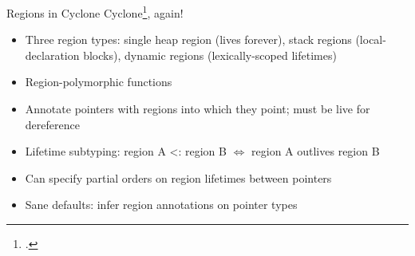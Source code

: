 \documentclass[aspectratio=169]{beamer}
\begin{document}
\begin{frame}{Regions in Cyclone}
    Cyclone\footcite{grossman_region-based_2002}, again!
    \begin{itemize}[<+->]
        \item Three region types: single \alert{heap} region (lives forever), \alert{stack} regions (local-declaration blocks), \alert{dynamic} regions (lexically-scoped lifetimes)
        \item Region-polymorphic functions
        \item Annotate pointers with regions into which they point; must be live for dereference
        \item Lifetime subtyping: region A <: region B $\Leftrightarrow$ region A \alert{outlives} region B
        \item Can specify partial orders on region lifetimes between pointers
        \item Sane defaults: infer region annotations on pointer types  %
    \end{itemize}
    \vspace{0.1in}
\end{frame}
\end{document}
